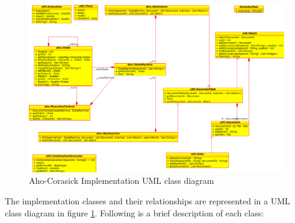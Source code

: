 \documentclass[10pt]{report}
\begin{document}
\begin{figure}
  \begin{center}
	\includegraphics[angle=90,width=\textwidth,height=!]{ahouml}
  \end{center}
  \caption{Aho-Corasick Implementation UML class diagram}
  \label{fig:ahouml}
\end{figure} 

The implementation classes and their relationships are represented in
a UML class diagram in figure \ref{fig:ahouml}. Following is a brief
description of each class:
\end{document}
